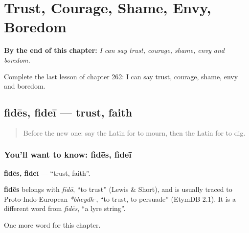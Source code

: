 
\chapter{Trust, Courage, Shame, Envy, Boredom}
\label{ch:la-trust-courage-shame-envy-boredom}

\begin{chapteropening}
\textbf{By the end of this chapter:} \emph{I can say trust, courage, shame, envy and boredom.}

Complete the last lesson of chapter 262: I can say trust, courage, shame, envy and boredom.
\end{chapteropening}

\section[fidēs, fideī]{fidēs, fideī — trust, faith}

\label{lesson:LA-C262-fides}



\begin{quote}
Before the new one: say the Latin for to mourn, then the Latin for to dig.
\end{quote}

\subsection*{You'll want to know: fidēs, fideī}
\textbf{fidēs, fideī} — \textquotedblleft{}trust, faith\textquotedblright{}.

\begin{cousinweb}
\textbf{fidēs} belongs with \emph{fīdō}, \textquotedblleft{}to trust\textquotedblright{} (Lewis \& Short), and is usually traced to Proto-Indo-European \emph{*bheydh-}, \textquotedblleft{}to trust, to persuade\textquotedblright{} (EtymDB 2.1). It is a different word from \emph{fidēs}, \textquotedblleft{}a lyre string\textquotedblright{}.
\end{cousinweb}

\begin{grammarlens}[title={What you've built}]
One more word for this chapter.
\end{grammarlens}

